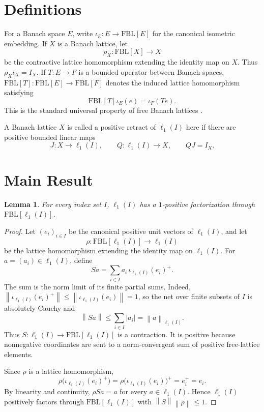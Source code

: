 \documentclass[11pt]{article}
\newtheorem{lemma}{Lemma}
\newcommand{\FBL}{\mathrm{FBL}}
\newcommand{\Id}{I}
\newcommand{\norm}[1]{\left\lVert #1 \right\rVert}
\begin{document}
\section*{Definitions}

For a Banach space \(E\), write \(\iota_E:E\to \FBL[E]\) for the canonical
isometric embedding.  If \(X\) is a Banach lattice, let
\[
\rho_X:\FBL[X]\longrightarrow X
\]
be the contractive lattice homomorphism extending the identity map on \(X\).
Thus \(\rho_X\iota_X=\Id_X\).  If \(T:E\to F\) is a bounded operator between
Banach spaces, \(\FBL[T]:\FBL[E]\to\FBL[F]\) denotes the induced lattice
homomorphism satisfying
\[
\FBL[T]\iota_E(e)=\iota_F(Te).
\]
This is the standard universal property of free Banach lattices
\cite{Oikhberg2023,ART2018}.

A Banach lattice \(X\) is called a positive retract of \(\ell_1(I)\) here if
there are positive bounded linear maps
\[
J:X\to \ell_1(I),
\qquad
Q:\ell_1(I)\to X,
\qquad
QJ=\Id_X.
\]

\section*{Main Result}

\begin{lemma}\label{lem:ellone}
For every index set \(I\), \(\ell_1(I)\) has a \(1\)-positive factorization
through \(\FBL[\ell_1(I)]\).
\end{lemma}

\begin{proof}
Let \((e_i)_{i\in I}\) be the canonical positive unit vectors of
\(\ell_1(I)\), and let
\[
\rho:\FBL[\ell_1(I)]\to \ell_1(I)
\]
be the lattice homomorphism extending the identity map on \(\ell_1(I)\).
For \(a=(a_i)\in\ell_1(I)\), define
\[
S a=\sum_{i\in I} a_i\,\iota_{\ell_1(I)}(e_i)^+.
\]
The sum is the norm limit of its finite partial sums.  Indeed,
\(\norm{\iota_{\ell_1(I)}(e_i)^+}\leq
\norm{\iota_{\ell_1(I)}(e_i)}=1\), so the net over finite subsets of \(I\)
is absolutely Cauchy and
\[
\norm{S a}\leq \sum_{i\in I}|a_i|=\norm{a}_{\ell_1(I)}.
\]
Thus \(S:\ell_1(I)\to\FBL[\ell_1(I)]\) is a contraction.  It is positive
because nonnegative coordinates are sent to a norm-convergent sum of positive
free-lattice elements.

Since \(\rho\) is a lattice homomorphism,
\[
\rho\big(\iota_{\ell_1(I)}(e_i)^+\big)
=\rho\big(\iota_{\ell_1(I)}(e_i)\big)^+
=e_i^+
=e_i .
\]
By linearity and continuity, \(\rho S a=a\) for every \(a\in\ell_1(I)\).
Hence \(\ell_1(I)\) positively factors through \(\FBL[\ell_1(I)]\) with
\(\norm{S}\norm{\rho}\leq 1\).
\end{proof}
\end{document}
